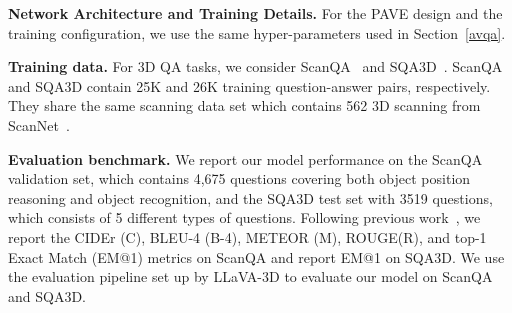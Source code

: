 \medskip
\noindent \textbf{Network Architecture and Training Details.} For the PAVE design and the training configuration, we use the same hyper-parameters used in Section~\ref{avqa}.


\medskip
\noindent\textbf{Training data.} For 3D QA tasks, we consider ScanQA~\cite{azuma_2022_CVPR} and SQA3D~\cite{ma2022sqa3d}. ScanQA and SQA3D contain 25K and 26K training question-answer pairs, respectively. They share the same scanning data set which contains 562 3D scanning from ScanNet~\cite{dai2017scannet}. 


\medskip
\noindent\textbf{Evaluation benchmark.} We report our model performance on the ScanQA validation set, which contains 4,675 questions covering both object position reasoning and object recognition, and the SQA3D test set with 3519 questions, which consists of 5 different types of questions.
Following previous work~\cite{zhu2024llava3dsimpleeffectivepathway}, we report the CIDEr (C), BLEU-4 (B-4), METEOR (M), ROUGE(R), and top-1 Exact Match (EM@1) metrics on ScanQA and report EM@1 on SQA3D. We use the evaluation pipeline set up by LLaVA-3D to evaluate our model on ScanQA and SQA3D. 








